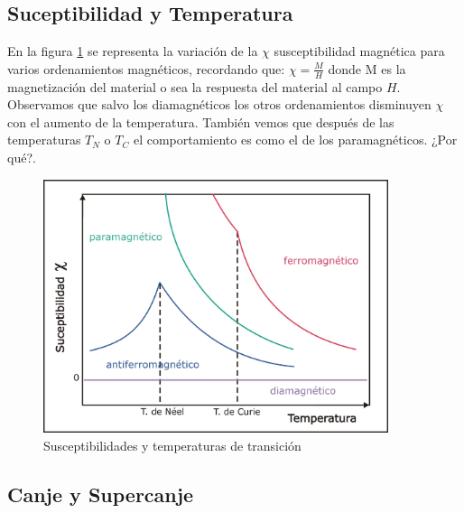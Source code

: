 \subsection{Suceptibilidad y Temperatura}

En la figura \ref{fig:suceptibilidades} se representa la variación de la $\chi$ susceptibilidad
magnética para varios ordenamientos magnéticos, recordando que: $\chi=\frac{M}{H}$ donde {M} es la magnetización del material o sea la respuesta del material al campo $H$. Observamos que salvo los diamagnéticos los
otros ordenamientos disminuyen $\chi$ con el aumento de la temperatura.
También vemos que después de las temperaturas $T_{N}$ o $T_{C}$ el
comportamiento es como el de los paramagnéticos. ¿Por qué?.

\begin{figure}[H]
    \centering
    \includegraphics[width=0.9\textwidth]{./Figures/suceptibilidades}
	\caption{Susceptibilidades y temperaturas de transición}
	\label{fig:suceptibilidades}
\end{figure}

\subsection{Canje y Supercanje}

